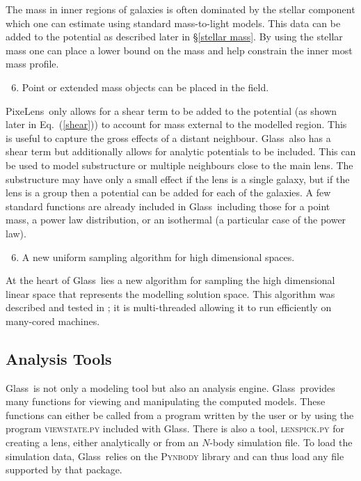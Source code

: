 \documentclass[galley,usenatbib]{mn2e}
\newcommand{\Glass}{{\sc Glass}}
\newcommand{\PixeLens}{{\sc PixeLens}}
\newcommand{\eqnref}[1] {Eq.~(\ref{#1})}
\newcommand{\secref}[1] {\S\ref{#1}}
\begin{document}
%
The mass in inner regions of galaxies is often dominated by the stellar component
which one can estimate using standard mass-to-light models. This data can be added
to the potential as described later in \secref{stellar mass}. By using the stellar
mass one can place a lower bound on the mass and help constrain the inner most
mass profile.
%
\begin{enumerate}
  \setcounter{enumi}{5}
  \item Point or extended mass objects can be placed in the field.
\end{enumerate}
%
\PixeLens\ only allows for a shear term to be added to the potential (as shown
later in \eqnref{shear}) to account for mass external to the modelled region. This
is useful to capture the gross effects of a distant neighbour. \Glass\ also
has a shear term but additionally allows for analytic potentials to
be included. This can be used to model substructure or multiple neighbours close
to the main lens. The substructure may have only a small effect if the lens is
a single galaxy, but if the lens is a group then a potential can be added for
each of the galaxies. A few standard functions are already included in \Glass\
including those for a point mass, a power law distribution, or an isothermal (a
particular case of the power law).
%
\begin{enumerate}
  \setcounter{enumi}{5}
  \item A new uniform sampling algorithm for high dimensional spaces.
\end{enumerate}
%
At the heart of \Glass\ lies a new algorithm for sampling the high dimensional
linear space that represents the modelling solution space. This algorithm was
described and tested in \cite{2012MNRAS.425.3077L}; it is 
multi-threaded allowing it to run efficiently on many-cored machines.  

\subsection{Analysis Tools}\label{sec:tools}
\Glass\ is not only a modeling tool but also an analysis engine. \Glass\
provides many functions for viewing and manipulating the computed models.
These functions can either be called from a program written by the user or by
using the program \textsc{viewstate.py} included with \Glass. There is also a
tool, \textsc{lenspick.py} for creating a lens, either analytically or from an
$N$-body simulation file. To load the simulation data, \Glass\ relies on the
\textsc{Pynbody} library \citep{pynbody} and can thus load any file supported by that package.
\end{document}
